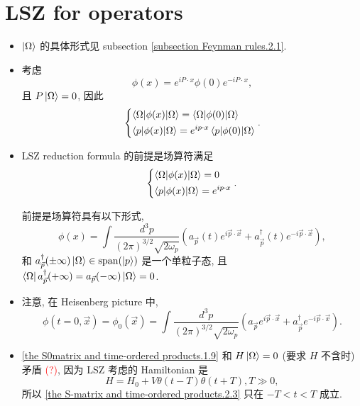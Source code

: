 \section{LSZ for operators} \label{the S-matrix and time ordered products.2}
\begin{itemize}
	\item $\ket{\Omega}$ 的具体形式见 subsection \ref{subsection Feynman rules.2.1}.
	
	\item 考虑
	\begin{equation}
		\phi(x) = e^{i P \cdot x} \phi(0) e^{- i P \cdot x},
	\end{equation}
	且 $P \ket{\Omega} = 0$, 因此
	\begin{equation}
		\begin{dcases}
			\braket{\Omega | \phi(x) | \Omega} = \braket{\Omega | \phi(0) | \Omega} \\
			\braket{p | \phi(x) | \Omega} = e^{i p \cdot x} \braket{p | \phi(0) | \Omega}
		\end{dcases}.
	\end{equation}
	
	\item LSZ reduction formula 的前提是场算符满足
	\begin{equation} \label{the S-matrix and time-ordered products.2.3}
		\begin{dcases}
			\braket{\Omega | \phi(x) | \Omega} = 0 \\
			\braket{p | \phi(x) | \Omega} = e^{i p \cdot x}
		\end{dcases}.
	\end{equation}
	
	\begin{tcolorbox}[title=remark:]
		前提是场算符具有以下形式,
		\begin{equation}
			\phi(x) = \int \frac{d^3 p}{(2 \pi)^{3 / 2} \sqrt{2 \omega_p}} (a_{\vec{p}}(t) e^{i \vec{p} \cdot \vec{x}} + a^\dag_{\vec{p}}(t) e^{- i \vec{p} \cdot \vec{x}}),
		\end{equation}
		和 $a^\dag_{\vec{p}}(\pm \infty) \ket{\Omega} \in \mathrm{span}(\ket{p})$ 是一个单粒子态, 且 $\bra{\Omega} a^\dag_{\vec{p}}(+ \infty) = a_{\vec{p}}(- \infty) \ket{\Omega} = 0$.
	\end{tcolorbox}
	
	\item 注意, 在 Heisenberg picture 中,
	\begin{equation}
		\phi(t = 0, \vec{x}) = \phi_0(\vec{x}) = \int \frac{d^3 p}{(2 \pi)^{3 / 2} \sqrt{2 \omega_p}} (a_{\vec{p}} e^{i \vec{p} \cdot \vec{x}} + a^\dag_{\vec{p}} e^{- i \vec{p} \cdot \vec{x}}).
	\end{equation}
	
	\item \eqref{the S0matrix and time-ordered products.1.9} 和 $H \ket{\Omega} = 0$ (要求 $H$ 不含时) 矛盾 \textcolor{red}{(?)}, 因为 LSZ 考虑的 Hamiltonian 是
	\begin{equation}
		H = H_0 + V \theta(t - T) \theta(t + T), T \gg 0,
	\end{equation}
	所以 \eqref{the S-matrix and time-ordered products.2.3} 只在 $- T < t < T$ 成立.
\end{itemize}
